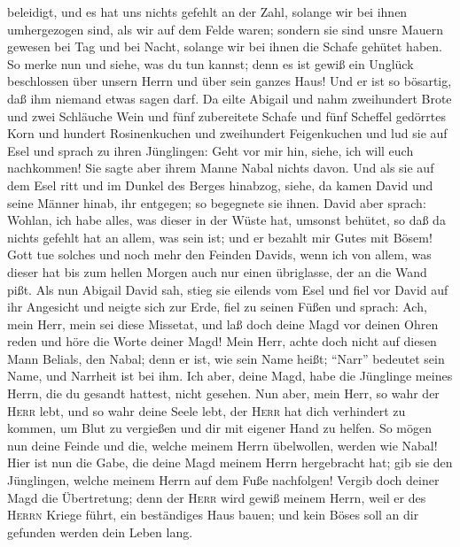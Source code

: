 beleidigt, und es hat uns nichts gefehlt an der Zahl, solange wir bei
ihnen umhergezogen sind, als wir auf dem Felde waren; 
sondern sie sind unsre Mauern gewesen bei Tag und bei Nacht, solange wir
bei ihnen die Schafe gehütet haben.  So merke nun und
siehe, was du tun kannst; denn es ist gewiß ein Unglück beschlossen über
unsern Herrn und über sein ganzes Haus! Und er ist so bösartig, daß ihm
niemand etwas sagen darf.  Da eilte Abigail und nahm
zweihundert Brote und zwei Schläuche Wein und fünf zubereitete Schafe
und fünf Scheffel gedörrtes Korn und hundert Rosinenkuchen und
zweihundert Feigenkuchen und lud sie auf Esel  und sprach
zu ihren Jünglingen: Geht vor mir hin, siehe, ich will euch nachkommen!
Sie sagte aber ihrem Manne Nabal nichts davon.  Und als
sie auf dem Esel ritt und im Dunkel des Berges hinabzog, siehe, da kamen
David und seine Männer hinab, ihr entgegen; so begegnete sie ihnen.
 David aber sprach: Wohlan, ich habe alles, was dieser in
der Wüste hat, umsonst behütet, so daß da nichts gefehlt hat an allem,
was sein ist; und er bezahlt mir Gutes mit Bösem!  Gott
tue solches und noch mehr den Feinden Davids, wenn ich von allem, was
dieser hat bis zum hellen Morgen auch nur einen übriglasse, der an die
Wand pißt.  Als nun Abigail David sah, stieg sie eilends
vom Esel und fiel vor David auf ihr Angesicht und neigte sich zur Erde,
 fiel zu seinen Füßen und sprach: Ach, mein Herr, mein
sei diese Missetat, und laß doch deine Magd vor deinen Ohren reden und
höre die Worte deiner Magd!  Mein Herr, achte doch nicht
auf diesen Mann Belials, den Nabal; denn er ist, wie sein Name heißt;
``Narr'' bedeutet sein Name, und Narrheit ist bei ihm. Ich aber, deine
Magd, habe die Jünglinge meines Herrn, die du gesandt hattest, nicht
gesehen.  Nun aber, mein Herr, so wahr der \textsc{Herr}
lebt, und so wahr deine Seele lebt, der \textsc{Herr} hat dich
verhindert zu kommen, um Blut zu vergießen und dir mit eigener Hand zu
helfen. So mögen nun deine Feinde und die, welche meinem Herrn
übelwollen, werden wie Nabal!  Hier ist nun die Gabe, die
deine Magd meinem Herrn hergebracht hat; gib sie den Jünglingen, welche
meinem Herrn auf dem Fuße nachfolgen!  Vergib doch deiner
Magd die Übertretung; denn der \textsc{Herr} wird gewiß meinem Herrn,
weil er des \textsc{Herrn} Kriege führt, ein beständiges Haus bauen; und
kein Böses soll an dir gefunden werden dein Leben lang. 
